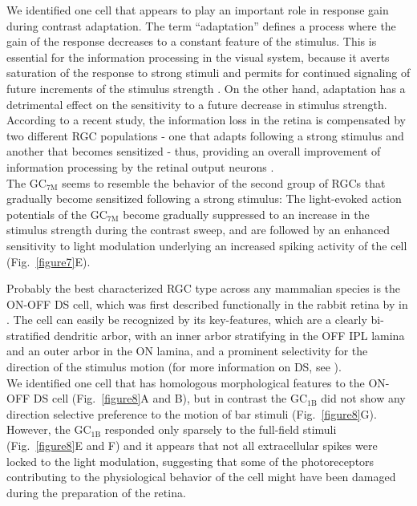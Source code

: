We identified one cell that appears to play an important role in response gain during contrast adaptation. The term “adaptation” defines a process where the gain of the response decreases to a constant feature of the stimulus. This is essential for the information processing in the visual system, because it averts saturation of the response to strong stimuli and permits for continued signaling of future increments of the stimulus strength \citep{laughlin89, smirnakis97}. On the other hand, adaptation has a detrimental effect on the sensitivity to a future decrease in stimulus strength. According to a recent study, the information loss in the retina is compensated by two different RGC populations - one that adapts following a strong stimulus and another that becomes sensitized - thus, providing an overall improvement of information processing by the retinal output neurons \citep{kastner11}.\\
The GC$_{\text{7M}}$ seems to resemble the behavior of the second group of RGCs that gradually become sensitized following a strong stimulus: The light-evoked action potentials of the GC$_{\text{7M}}$ become gradually suppressed to an increase in the stimulus strength during the contrast sweep,  and are followed by an enhanced sensitivity to light modulation underlying an increased spiking activity of the cell  (Fig.~\ref{figure7}E). 

Probably the best characterized RGC type across any mammalian species is the ON-OFF DS cell, which was first described functionally in the rabbit retina by \citeauthor{barlow63} in \citeyear{barlow63}. The cell can easily be recognized by its key-features, which are a clearly bi-stratified dendritic arbor, with an inner arbor stratifying in the OFF IPL lamina and an outer arbor in the ON lamina, and a prominent selectivity for the direction of the stimulus motion (for more information on DS, see \citealp{vaney12}).\\
We identified one cell that has homologous morphological features to the ON-OFF DS cell (Fig.~\ref{figure8}A and B), but in contrast the GC$_{\text{1B}}$ did not show any direction selective preference to the motion of bar stimuli (Fig.~\ref{figure8}G). However, the GC$_{\text{1B}}$ responded only sparsely to the full-field stimuli (Fig.~\ref{figure8}E and F) and it appears that not all extracellular spikes were locked to the light modulation, suggesting that some of the photoreceptors contributing to the physiological behavior of the cell might have been damaged during the preparation of the retina. 

